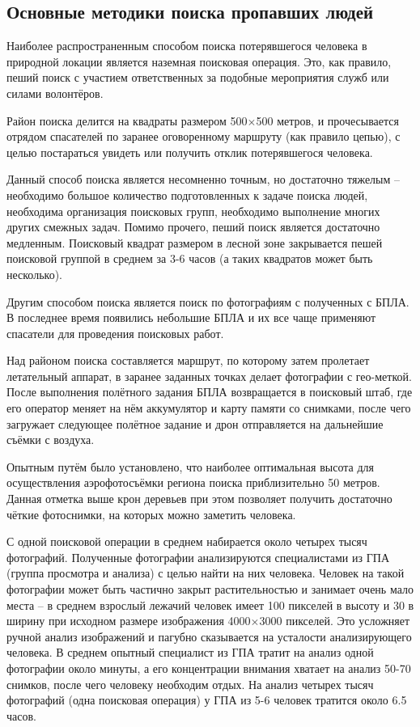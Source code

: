 \subsection{Основные методики поиска пропавших людей}

Наиболее распространенным способом поиска потерявшегося человека в природной локации является наземная поисковая операция. Это, как правило, пеший поиск с участием ответственных за подобные мероприятия служб или силами волонтёров. 

Район поиска делится на квадраты размером 500$\times$500 метров, и прочесывается отрядом спасателей по заранее оговоренному маршруту (как правило цепью), с целью постараться увидеть или получить отклик потерявшегося человека. 

Данный способ поиска является несомненно точным, но достаточно тяжелым -- необходимо большое количество подготовленных к задаче поиска людей, необходима организация поисковых групп, необходимо выполнение многих других смежных задач. Помимо прочего, пеший поиск является достаточно медленным. Поисковый квадрат размером в лесной зоне закрывается пешей поисковой группой в среднем за 3-6 часов (а таких квадратов может быть несколько).

Другим способом поиска является поиск по фотографиям с полученных с БПЛА. В последнее время появились небольшие БПЛА и их все чаще применяют спасатели для проведения поисковых работ. 

Над районом поиска составляется маршрут, по которому затем пролетает летательный аппарат, в заранее заданных точках делает фотографии с гео-меткой. После выполнения полётного задания БПЛА возвращается в поисковый штаб, где его оператор меняет на нём аккумулятор и карту памяти со снимками, после чего загружает следующее полётное задание и дрон отправляется на дальнейшие съёмки с воздуха.

Опытным путём было установлено, что наиболее оптимальная высота для осуществления аэрофотосъёмки региона поиска приблизительно 50 метров. Данная отметка выше крон деревьев при этом позволяет получить достаточно чёткие фотоснимки, на которых можно заметить человека.

С одной поисковой операции в среднем набирается около четырех тысяч фотографий. Полученные фотографии анализируются специалистами из ГПА (группа просмотра и анализа) с целью найти на них человека. Человек на такой фотографии может быть частично закрыт растительностью и занимает очень мало места -- в среднем взрослый лежачий человек имеет 100 пикселей в высоту и 30 в ширину при исходном размере изображения 4000$\times$3000 пикселей. Это усложняет ручной анализ изображений и пагубно сказывается на усталости анализирующего человека. В среднем опытный специалист из ГПА тратит на анализ одной фотографии около минуты, а его концентрации внимания хватает на анализ 50-70 снимков, после чего человеку необходим отдых. На анализ четырех тысяч фотографий (одна поисковая операция) у ГПА из 5-6 человек тратится около 6.5 часов.